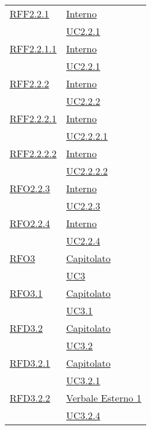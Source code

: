 \begin{longtable}{|>{\centering}m{5cm}|m{5cm}<{\centering}|}
\hyperlink{RFF2.2.1}{RFF2.2.1} & \hyperlink{Interno}{Interno}\\
& \hyperref[UC2.2.1]{UC2.2.1}\\ \hline

\hyperlink{RFF2.2.1.1}{RFF2.2.1.1} & \hyperlink{Interno}{Interno}\\
& \hyperref[UC2.2.1]{UC2.2.1}\\ \hline

\hyperlink{RFF2.2.2}{RFF2.2.2} & \hyperlink{Interno}{Interno}\\
& \hyperref[UC2.2.2]{UC2.2.2}\\ \hline

\hyperlink{RFF2.2.2.1}{RFF2.2.2.1} & \hyperlink{Interno}{Interno}\\
& \hyperref[UC2.2.2.1]{UC2.2.2.1}\\ \hline

\hyperlink{RFF2.2.2.2}{RFF2.2.2.2} & \hyperlink{Interno}{Interno}\\
& \hyperref[UC2.2.2.2]{UC2.2.2.2}\\ \hline

\hyperlink{RFO2.2.3}{RFO2.2.3} & \hyperlink{Interno}{Interno}\\
& \hyperref[UC2.2.3]{UC2.2.3}\\ \hline

\hyperlink{RFO2.2.4}{RFO2.2.4} & \hyperlink{Interno}{Interno}\\
& \hyperref[UC2.2.4]{UC2.2.4}\\ \hline

\hyperlink{RFO3}{RFO3} & \hyperlink{Capitolato}{Capitolato}\\
& \hyperref[UC3]{UC3}\\ \hline

\hyperlink{RFO3.1}{RFO3.1} & \hyperlink{Capitolato}{Capitolato}\\
& \hyperref[UC3.1]{UC3.1}\\ \hline

\hyperlink{RFD3.2}{RFD3.2} & \hyperlink{Capitolato}{Capitolato}\\
& \hyperref[UC3.2]{UC3.2}\\ \hline

\hyperlink{RFD3.2.1}{RFD3.2.1} & \hyperlink{Capitolato}{Capitolato}\\
& \hyperref[UC3.2.1]{UC3.2.1}\\ \hline

\hyperlink{RFD3.2.2}{RFD3.2.2} & \hyperlink{Verbale Esterno 1}{Verbale Esterno 1}\\
& \hyperref[UC3.2.4]{UC3.2.4}\\ \hline


\end{longtable}
